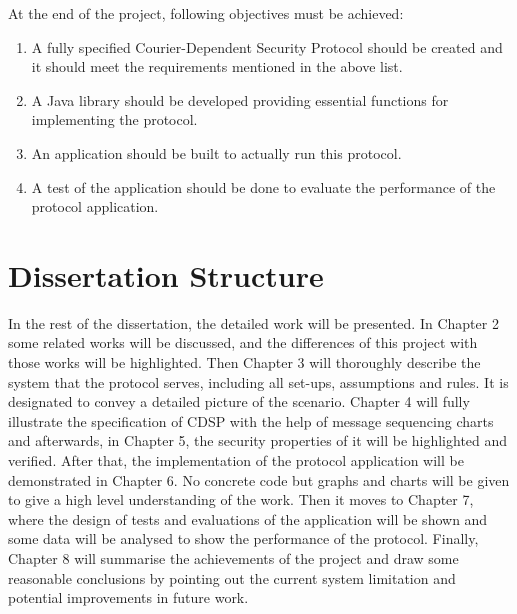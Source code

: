 \noindent
At the end of the project, following objectives must be achieved:
\begin{enumerate}
\item A fully specified Courier-Dependent Security Protocol should be created and it should meet the requirements mentioned in the above list.
\item A Java library should be developed providing essential functions for implementing the protocol.
\item An application should be built to actually run this protocol.
\item A test of the application should be done to evaluate the performance of the protocol application.
\end{enumerate}

\section{Dissertation Structure}
In the rest of the dissertation, the detailed work will be presented. In Chapter 2 some related works will be discussed, and the differences of this project with those works will be highlighted. Then Chapter 3 will thoroughly describe the system that the protocol serves, including all set-ups, assumptions and rules. It is designated to convey a detailed picture of the scenario. Chapter 4 will fully illustrate the specification of CDSP with the help of message sequencing charts and afterwards, in Chapter 5, the security properties of it will be highlighted and verified. After that, the implementation of the protocol application will be demonstrated in Chapter 6. No concrete code but graphs and charts will be given to give a high level understanding of the work. Then it moves to Chapter 7, where the design of tests and evaluations of the application will be shown and some data will be analysed to show the performance of the protocol. Finally, Chapter 8 will summarise the achievements of the project and draw some reasonable conclusions by pointing out the current system limitation and potential improvements in future work.